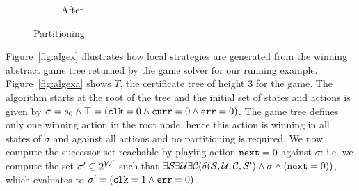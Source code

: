 \begin{figure}[b]
\begin{subfigure}[t]{.3\textwidth}
\begin{minipage}[t][3cm][t]{\textwidth}
        \end{minipage}
        \caption{After}
    \end{subfigure}%
    \hspace*{\fill}
    \caption{Partitioning}
    \label{fig:partition}
\end{figure}

Figure~\ref{fig:algex} illustrates how local strategies are generated from the winning abstract game tree returned by the game solver for our running example.  Figure~\ref{fig:algexa} shows $T$, the certificate tree of height 3 for the game. The algorithm starts at the root of the tree and the initial set of states and actions is given by $\sigma = s_0 \land \top = (\texttt{clk} = 0 \land \texttt{curr} = 0 \land \texttt{err} = 0)$. The game tree defines only one winning action in the root node, hence this action is winning in all states of $\sigma$ and against all actions and no partitioning is required.  We now compute the successor set reachable by playing action $\texttt{next} = 0$ against $\sigma$: i.e. we compute the set $\sigma' \subseteq 2^{\mathcal{W}'}$ such that $\exists \mathcal{S} \exists \mathcal{U} \exists \mathcal{C} (\delta(\mathcal{S}, \mathcal{U}, \mathcal{C}, \mathcal{S}') \land \sigma \land (\texttt{next} = 0))$, which evaluates to $\sigma' = (\texttt{clk} = 1 \land \texttt{err} = 0)$.

